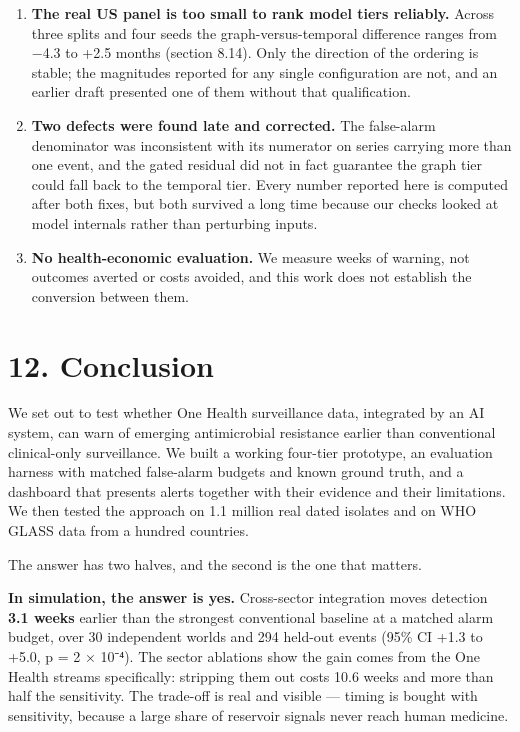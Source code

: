 \documentclass[11pt,a4paper]{article}
\begin{document}
\begin{enumerate}[leftmargin=1.3em,itemsep=2pt]
  \item \textbf{The real US panel is too small to rank model tiers reliably.} Across three splits and four seeds the graph-versus-temporal difference ranges from −4.3 to +2.5 months (section 8.14). Only the direction of the ordering is stable; the magnitudes reported for any single configuration are not, and an earlier draft presented one of them without that qualification.
  \item \textbf{Two defects were found late and corrected.} The false-alarm denominator was inconsistent with its numerator on series carrying more than one event, and the gated residual did not in fact guarantee the graph tier could fall back to the temporal tier. Every number reported here is computed after both fixes, but both survived a long time because our checks looked at model internals rather than perturbing inputs.
  \item \textbf{No health-economic evaluation.} We measure weeks of warning, not outcomes averted or costs avoided, and this work does not establish the conversion between them.
\end{enumerate}

\section*{12. Conclusion}

We set out to test whether One Health surveillance data, integrated by an AI system, can warn of emerging antimicrobial resistance earlier than conventional clinical-only surveillance. We built a working four-tier prototype, an evaluation harness with matched false-alarm budgets and known ground truth, and a dashboard that presents alerts together with their evidence and their limitations. We then tested the approach on 1.1 million real dated isolates and on WHO GLASS data from a hundred countries.

The answer has two halves, and the second is the one that matters.

\textbf{In simulation, the answer is yes.} Cross-sector integration moves detection \textbf{3.1 weeks} earlier than the strongest conventional baseline at a matched alarm budget, over 30 independent worlds and 294 held-out events (95\% CI +1.3 to +5.0, p = 2 × 10⁻⁴). The sector ablations show the gain comes from the One Health streams specifically: stripping them out costs 10.6 weeks and more than half the sensitivity. The trade-off is real and visible — timing is bought with sensitivity, because a large share of reservoir signals never reach human medicine.
\end{document}
